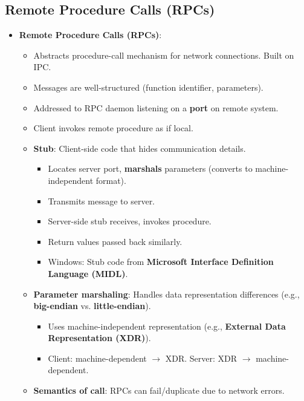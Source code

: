 \subsection{Remote Procedure Calls (RPCs)}
\begin{itemize}
    \item \textbf{Remote Procedure Calls (RPCs)}:
        \begin{itemize}
            \item Abstracts procedure-call mechanism for network connections. Built on IPC.
            \item Messages are well-structured (function identifier, parameters).
            \item Addressed to RPC daemon listening on a \textbf{port} on remote system.
            \item Client invokes remote procedure as if local.
            \item \textbf{Stub}: Client-side code that hides communication details.
                \begin{itemize}
                    \item Locates server port, \textbf{marshals} parameters (converts to machine-independent format).
                    \item Transmits message to server.
                    \item Server-side stub receives, invokes procedure.
                    \item Return values passed back similarly.
                    \item Windows: Stub code from \textbf{Microsoft Interface Definition Language (MIDL)}.
                \end{itemize}
            \item \textbf{Parameter marshaling}: Handles data representation differences (e.g., \textbf{big-endian} vs. \textbf{little-endian}).
                \begin{itemize}
                    \item Uses machine-independent representation (e.g., \textbf{External Data Representation (XDR)}).
                    \item Client: machine-dependent $\rightarrow$ XDR. Server: XDR $\rightarrow$ machine-dependent.
                \end{itemize}
            \item \textbf{Semantics of call}: RPCs can fail/duplicate due to network errors.
                \begin{itemize}

\end{itemize}
\end{itemize}
\end{itemize}
